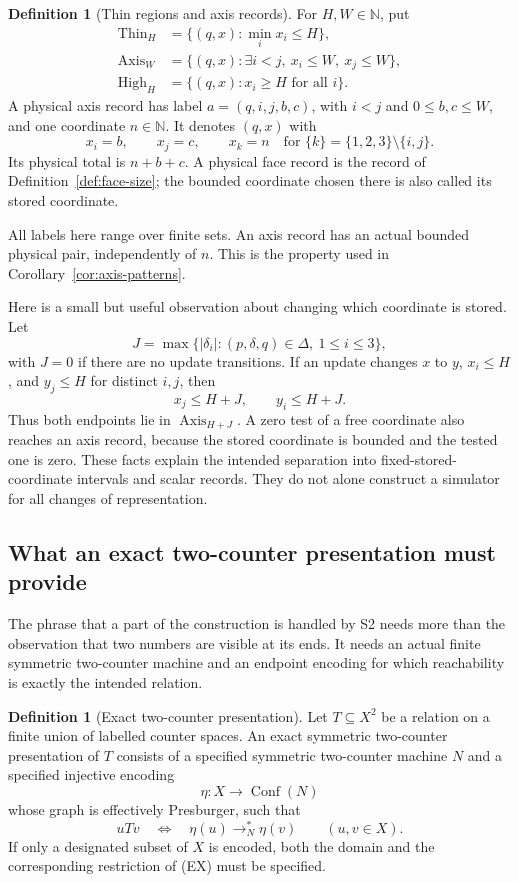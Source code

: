 \documentclass[11pt,a4paper]{article}
\theoremstyle{definition}
\newtheorem{definition}[theorem]{Definition}
\theoremstyle{remark}
\newcommand{\N}{\mathbb N}
\begin{document}
\begin{definition}[Thin regions and axis records]
\label{def:axis-record}
For \(H,W\in\N\), put
\[
\begin{split}
 \operatorname{Thin}_H
   &=\{(q,x):\min_i x_i\le H\},\\
 \operatorname{Axis}_W
   &=\{(q,x):\exists i<j,\ x_i\le W,\ x_j\le W\},\\
 \operatorname{High}_H
   &=\{(q,x):x_i\ge H\text{ for all }i\}.
\end{split}
\]
A physical axis record has label
\(a=(q,i,j,b,c)\), with \(i<j\) and \(0\le b,c\le W\), and one
coordinate \(n\in\N\). It denotes \((q,x)\) with
\[
 x_i=b,\qquad x_j=c,\qquad x_k=n
 \quad\text{for }\{k\}=\{1,2,3\}\setminus\{i,j\}.
\]
Its physical total is \(n+b+c\).
A physical face record is the record of
Definition~\ref{def:face-size}; the bounded coordinate chosen there
is also called its stored coordinate.
\end{definition}

All labels here range over finite sets. An axis record has an actual
bounded physical pair, independently of \(n\). This is the property
used in Corollary~\ref{cor:axis-patterns}.

Here is a small but useful observation about changing which coordinate
is stored. Let
\[
 J=\max\{|\delta_i|:(p,\delta,q)\in\Delta,\ 1\le i\le3\},
\]
with \(J=0\) if there are no update transitions.
If an update changes \(x\) to \(y\), \(x_i\le H\), and \(y_j\le H\)
for distinct \(i,j\), then
\[
 x_j\le H+J,\qquad y_i\le H+J.
\]
Thus both endpoints lie in \(\operatorname{Axis}_{H+J}\).
A zero test of a free coordinate also reaches an axis record, because
the stored coordinate is bounded and the tested one is zero.
These facts explain the intended separation into fixed-stored-coordinate
intervals and scalar records. They do not alone construct a simulator
for all changes of representation.

\subsection{What an exact two-counter presentation must provide}

The phrase that a part of the construction is handled by S2 needs
more than the observation that two numbers are visible at its ends.
It needs an actual finite symmetric two-counter machine and an
endpoint encoding for which reachability is exactly the intended
relation.

\begin{definition}[Exact two-counter presentation]
\label{def:exact-presentation}
Let \(T\subseteq X^2\) be a relation on a finite union of labelled
counter spaces. An exact symmetric two-counter presentation of \(T\)
consists of a specified symmetric two-counter machine \(N\) and a
specified injective encoding
\[
 \eta:X\longrightarrow \operatorname{Conf}(N)
\]
whose graph is effectively Presburger, such that
\[
 uTv\quad\Longleftrightarrow\quad
 \eta(u)\longrightarrow_N^*\eta(v)
 \qquad(u,v\in X).
 \tag{EX}
\]
If only a designated subset of \(X\) is encoded, both the domain and
the corresponding restriction of (EX) must be specified.
\end{definition}
\end{document}
